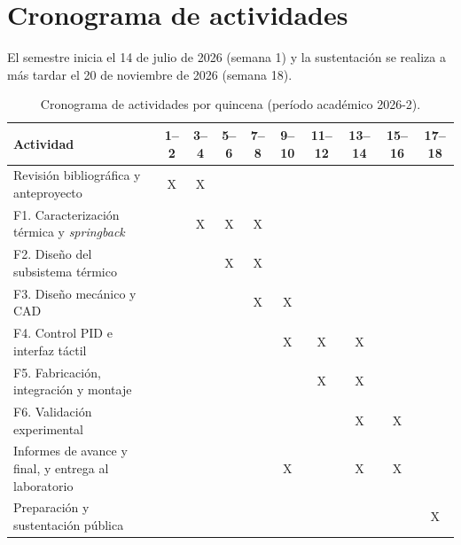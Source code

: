 \section{Cronograma de actividades}

El semestre inicia el 14 de julio de 2026 (semana 1) y la sustentación se realiza a más tardar el 20 de noviembre de 2026 (semana 18).

\begin{table}[H]
\centering
\singlespacing
\scriptsize
\caption{Cronograma de actividades por quincena (período académico 2026-2).}
\label{tab:cronograma}
\setlength{\tabcolsep}{3pt}
\renewcommand{\arraystretch}{0.95}
\begin{tabular}{p{5.2cm}*{9}{c}}
\toprule
\textbf{Actividad} & \textbf{1--2} & \textbf{3--4} & \textbf{5--6} & \textbf{7--8} & \textbf{9--10} & \textbf{11--12} & \textbf{13--14} & \textbf{15--16} & \textbf{17--18}\\
\midrule
Revisión bibliográfica y anteproyecto & X & X & & & & & & & \\
F1. Caracterización térmica y \emph{springback} & & X & X & X & & & & & \\
F2. Diseño del subsistema térmico & & & X & X & & & & & \\
F3. Diseño mecánico y CAD & & & & X & X & & & & \\
F4. Control PID e interfaz táctil & & & & & X & X & X & & \\
F5. Fabricación, integración y montaje & & & & & & X & X & & \\
F6. Validación experimental & & & & & & & X & X & \\
Informes de avance y final, y entrega al laboratorio & & & & & X & & X & X & \\
Preparación y sustentación pública & & & & & & & & & X\\
\bottomrule
\end{tabular}
\end{table}
